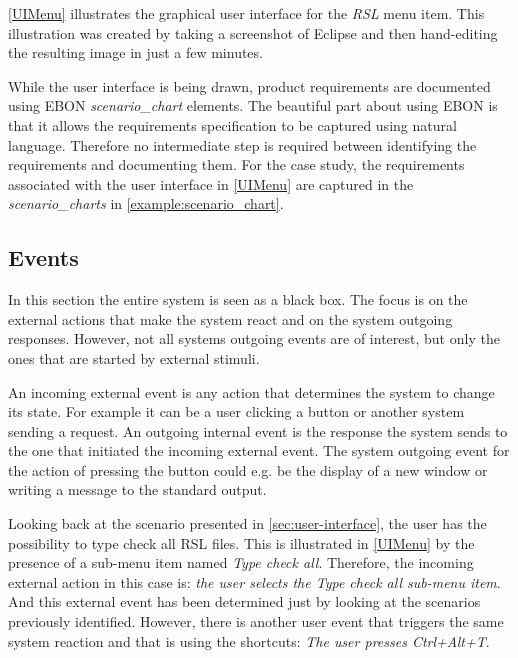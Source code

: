 \documentclass[conference]{IEEEtran}
\begin{document}
\autoref{UIMenu} illustrates the graphical user interface for the
\emph{RSL} menu item.  This illustration was created by taking a
screenshot of Eclipse and then hand-editing the resulting image in
just a few minutes.



While the user interface is being drawn, product requirements are
documented using EBON \emph{scenario\_chart} elements. The beautiful
part about using EBON is that it allows the requirements specification
to be captured using natural language. Therefore no intermediate step
is required between identifying the requirements and documenting them.
For the case study, the requirements associated with the user
interface in \autoref{UIMenu} are captured in the
\emph{scenario\_charts} in \autoref{example:scenario_chart}.

%
\subsection{Events}
\label{sec:events}

In this section the entire system is seen as a black box. The focus is
on the external actions that make the system react and on the system
outgoing responses. However, not all systems outgoing events are of
interest, but only the ones that are started by external stimuli. 

An incoming external event is any action that determines the system to
change its state. For example it can be a user clicking a button or
another system sending a request. An outgoing internal event is the
response the system sends to the one that initiated the incoming
external event. The system outgoing event for the action of pressing
the button could e.g. be the display of a new window or writing a
message to the standard output.

Looking back at the scenario presented in
\autoref{sec:user-interface}, the user has the possibility to type
check all RSL files. This is illustrated in \autoref{UIMenu} by the
presence of a sub-menu item named \emph{Type check all}. Therefore,
the incoming external action in this case is: \emph{the user selects
the Type check all sub-menu item}. And this external event has been
determined just by looking at the scenarios previously identified.
However, there is another user event that triggers the same system
reaction and that is using the shortcuts: \emph{The user presses
Ctrl+Alt+T}.
\end{document}
